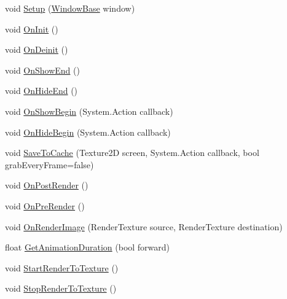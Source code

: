 \begin{DoxyCompactItemize}
\item 
void \hyperlink{class_unity_engine_1_1_u_i_1_1_windows_1_1_transition_a11df386cd753fb65bcde253a2aeab3fc}{Setup} (\hyperlink{class_unity_engine_1_1_u_i_1_1_windows_1_1_window_base}{Window\+Base} window)
\item 
void \hyperlink{class_unity_engine_1_1_u_i_1_1_windows_1_1_transition_ab2b67493b0b5aa288dbff6a4189346a8}{On\+Init} ()
\item 
void \hyperlink{class_unity_engine_1_1_u_i_1_1_windows_1_1_transition_a29ec990775ca8e720766642979ebf1d0}{On\+Deinit} ()
\item 
void \hyperlink{class_unity_engine_1_1_u_i_1_1_windows_1_1_transition_a3de7956878b055fcd5425e4e3751ef48}{On\+Show\+End} ()
\item 
void \hyperlink{class_unity_engine_1_1_u_i_1_1_windows_1_1_transition_a4be92f1d5d46bc445b616dec28eb51d2}{On\+Hide\+End} ()
\item 
void \hyperlink{class_unity_engine_1_1_u_i_1_1_windows_1_1_transition_a00a87050c9164c9fc63078d87f330dfe}{On\+Show\+Begin} (System.\+Action callback)
\item 
void \hyperlink{class_unity_engine_1_1_u_i_1_1_windows_1_1_transition_ad963bbec4a1539030779248bb9a11f77}{On\+Hide\+Begin} (System.\+Action callback)
\item 
void \hyperlink{class_unity_engine_1_1_u_i_1_1_windows_1_1_transition_a55383533f2b5c29d5bf3bd3e039e56a4}{Save\+To\+Cache} (Texture2\+D screen, System.\+Action callback, bool grab\+Every\+Frame=false)
\item 
void \hyperlink{class_unity_engine_1_1_u_i_1_1_windows_1_1_transition_a3512f02e7ba0540b2fe744d95357a401}{On\+Post\+Render} ()
\item 
void \hyperlink{class_unity_engine_1_1_u_i_1_1_windows_1_1_transition_abac552921942280aeac607fc81387770}{On\+Pre\+Render} ()
\item 
void \hyperlink{class_unity_engine_1_1_u_i_1_1_windows_1_1_transition_a7c9ad9df0237d686e6897327f256199a}{On\+Render\+Image} (Render\+Texture source, Render\+Texture destination)
\item 
float \hyperlink{class_unity_engine_1_1_u_i_1_1_windows_1_1_transition_aae6efb779a8904c5967b460e401e31b9}{Get\+Animation\+Duration} (bool forward)
\item 
void \hyperlink{class_unity_engine_1_1_u_i_1_1_windows_1_1_transition_a7b6bc88b5186fb38c4a9ec5ea3ac6828}{Start\+Render\+To\+Texture} ()
\item 
void \hyperlink{class_unity_engine_1_1_u_i_1_1_windows_1_1_transition_a1bfeb516973f620537f47b9ea3b31638}{Stop\+Render\+To\+Texture} ()
\end{DoxyCompactItemize}
